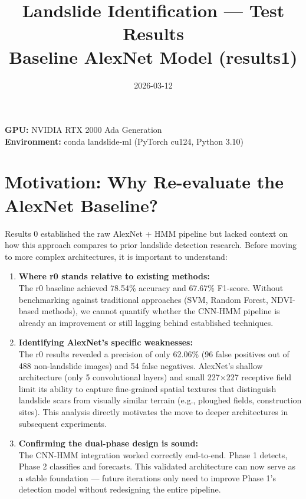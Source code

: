 \documentclass[11pt]{article}
\title{Landslide Identification — Test Results \\ \large Baseline AlexNet Model (results1)}
\author{}
\date{2026-03-12}
\begin{document}
\maketitle

\noindent\textbf{GPU:} NVIDIA RTX 2000 Ada Generation \\
\textbf{Environment:} conda landslide-ml (PyTorch cu124, Python 3.10) \\

\section{Motivation: Why Re-evaluate the AlexNet Baseline?}

Results 0 established the raw AlexNet + HMM pipeline but lacked context on how this approach compares to prior landslide detection research. Before moving to more complex architectures, it is important to understand:

\begin{enumerate}
    \item \textbf{Where r0 stands relative to existing methods:}\\
          The r0 baseline achieved 78.54\% accuracy and 67.67\% F1-score. Without benchmarking against traditional approaches (SVM, Random Forest, NDVI-based methods), we cannot quantify whether the CNN-HMM pipeline is already an improvement or still lagging behind established techniques.

    \item \textbf{Identifying AlexNet's specific weaknesses:}\\
          The r0 results revealed a precision of only 62.06\% (96 false positives out of 488 non-landslide images) and 54 false negatives. AlexNet's shallow architecture (only 5 convolutional layers) and small 227$\times$227 receptive field limit its ability to capture fine-grained spatial textures that distinguish landslide scars from visually similar terrain (e.g., ploughed fields, construction sites). This analysis directly motivates the move to deeper architectures in subsequent experiments.

    \item \textbf{Confirming the dual-phase design is sound:}\\
          The CNN-HMM integration worked correctly end-to-end. Phase 1 detects, Phase 2 classifies and forecasts. This validated architecture can now serve as a stable foundation --- future iterations only need to improve Phase 1's detection model without redesigning the entire pipeline.
\end{enumerate}
\end{document}
